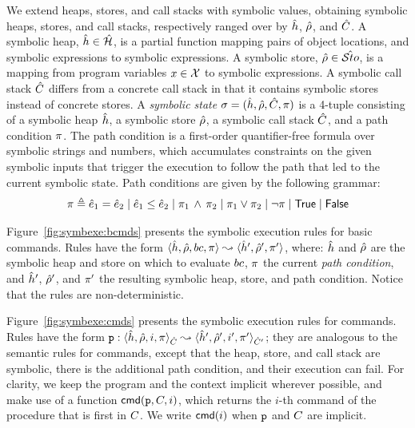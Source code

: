 We extend heaps, stores, and call stacks with symbolic values, obtaining symbolic 
heaps, stores, and call stacks, respectively ranged over by $\hat{h}$, $\hat\rho$, and $\hat{C}$. 
A symbolic heap, $\hat{h} \in \hat{\mathcal H}$, is a partial function mapping pairs of  
object locations, and symbolic expressions to symbolic expressions. 
A symbolic store, $\hat\rho \in \hat{{\mathcal S}to}$, is a mapping from program variables 
$x \in \mathcal{X}$ to symbolic expressions.
A symbolic call stack $\hat{C}$ differs from a concrete call stack in that it contains 
symbolic stores instead of concrete stores.
%
A \emph{symbolic state} $\sigma = (\hat{h}, \hat\rho, \hat{C}, \pi)$ is a 4-tuple consisting of a 
symbolic heap $\hat{h}$, a symbolic store $\hat\rho$, a symbolic call stack $\hat{C}$, and a path condition $\pi$. 
The path condition is a first-order quantifier-free formula over symbolic strings and 
numbers, which accumulates constraints on the given symbolic inputs that trigger 
the execution to follow the path that led to the current symbolic state. 
Path conditions are given by the following grammar: 
\begin{equation*}
\pi \triangleq \hat{e}_1 = \hat{e}_2 \mid \hat{e}_1 \leq \hat{e}_2 \mid \pi_1 \, \wedge \, \pi_2 \mid \pi_1 \vee \pi_2 \mid \neg \pi \mid \mathsf{True} \mid \mathsf{False}
\end{equation*}

Figure~\ref{fig:symbexe:bcmds} presents the symbolic execution rules for \jsil basic commands. 
Rules have the form $\symbtrans{\sheap, \sstore, \bcmd, \pc}{\sheap', \sstore', \pc'}$, 
where:  $\hat{h}$ and $\hat\rho$ are the symbolic heap and store on which to evaluate $bc$, 
 $\pi$ the current \emph{path condition}, and  $\hat{h}'$, $\hat\rho'$, and $\pi'$
the resulting symbolic heap, store, and path condition. Notice that the rules are non-deterministic.

Figure~\ref{fig:symbexe:cmds} presents the symbolic execution rules for \jsil commands. 
Rules have the form $\symbtrans[\prog]{\sheap, \sstore, i, \pc}{\sheap', \sstore', i', \pc'}[\sctx][\sctx']$; 
they are analogous to the semantic rules for \jsil commands, except that the heap, store, and call stack are symbolic, there is the additional path condition, and their execution can fail. For clarity, we keep the program and the context implicit wherever possible, and make use of a function $\ccmd{\prog, \ctx, i}$, which returns the $i$-th command of the procedure that is first in $C$. We write $\ccmd{i}$ when $\mathtt{p}$ and $C$ are implicit.


